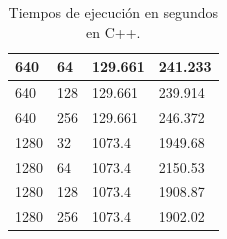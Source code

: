 \documentclass[conference]{IEEEtran}
\begin{document}
\begin{table}[h!]
\begin{tabularx}{220pt}{|X|X|X|X|}
    640  & 64  & 129.661     & 241.233     \\ \hline
    640  & 128 & 129.661     & 239.914     \\ \hline
    640  & 256 & 129.661     & 246.372     \\ \hline
    1280 & 32  & 1073.4      & 1949.68     \\ \hline
    1280 & 64  & 1073.4      & 2150.53     \\ \hline
    1280 & 128 & 1073.4      & 1908.87     \\ \hline
    1280 & 256 & 1073.4      & 1902.02     \\ \hline
    \end{tabularx}
    \caption{Tiempos de ejecución en segundos en C++.}
    \label{Tabla2}
    \end{table}
    
\end{document}
